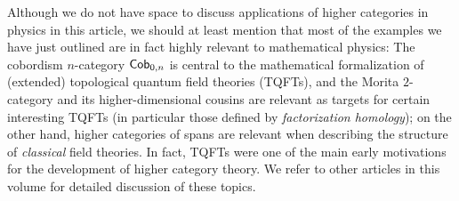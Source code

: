 \documentclass[a4paper,11pt]{article}
\begin{document}
\begin{remark}
  Although we do not have space to discuss applications of higher
  categories in physics in this article, we should at least mention
  that most of the examples we have just outlined are in fact highly
  relevant to mathematical physics: The cobordism $n$-category
  $\textup{\textsf{Cob}}_{0,n}$ is central to the mathematical formalization
  of (extended) topological quantum field theories (TQFTs), and the
  Morita $2$-category and its higher-dimensional cousins are relevant as
  targets for certain interesting TQFTs (in particular those defined
  by \emph{factorization homology}); on the other hand, higher
  categories of spans are relevant when describing the structure of
  \emph{classical} field theories. In fact, TQFTs were one of the main
  early motivations for the development of higher category theory. We
  refer to other articles in this volume for detailed discussion of
  these topics.
\end{remark}
\end{document}
